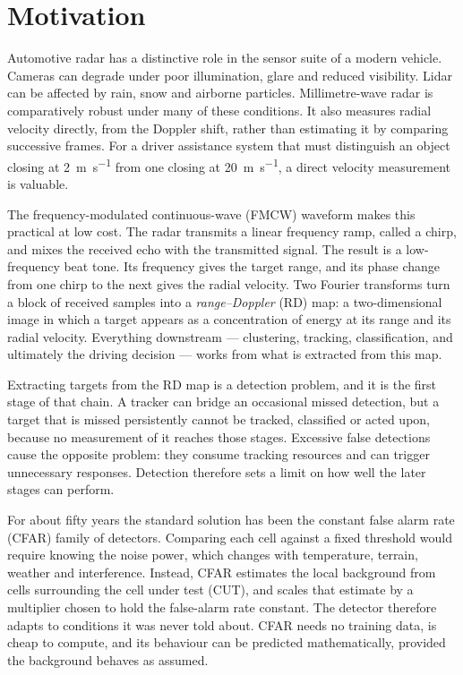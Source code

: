 
\section{Motivation}

Automotive radar has a distinctive role in the sensor suite of a modern vehicle. Cameras can degrade
under poor illumination, glare and reduced visibility. Lidar can be affected by rain, snow and
airborne particles. Millimetre-wave radar is comparatively robust under many of these conditions.
It also measures radial velocity directly, from the Doppler shift, rather than estimating it by
comparing successive frames. For a driver assistance system that must distinguish an object closing
at \SI{2}{\metre\per\second} from one closing at \SI{20}{\metre\per\second}, a direct velocity
measurement is valuable.

The frequency-modulated continuous-wave (FMCW) waveform makes this practical at low cost. The radar
transmits a linear frequency ramp, called a chirp, and mixes the received echo with the transmitted
signal. The result is a low-frequency beat tone. Its frequency gives the target range, and its phase
change from one chirp to the next gives the radial velocity. Two Fourier transforms turn a block of
received samples into a \emph{range--Doppler} (RD) map: a two-dimensional image in which a target
appears as a concentration of energy at its range and its radial velocity. Everything downstream ---
clustering, tracking, classification, and ultimately the driving decision --- works from what is
extracted from this map.

Extracting targets from the RD map is a detection problem, and it is the first stage of that chain.
A tracker can bridge an occasional missed detection, but a target that is missed persistently cannot
be tracked, classified or acted upon, because no measurement of it reaches those stages. Excessive
false detections cause the opposite problem: they consume tracking resources and can trigger
unnecessary responses. Detection therefore sets a limit on how well the later stages can perform.

For about fifty years the standard solution has been the constant false alarm rate (CFAR) family of
detectors. Comparing each cell against a fixed threshold would require knowing the noise power,
which changes with temperature, terrain, weather and interference. Instead, CFAR estimates the local
background from cells surrounding the cell under test (CUT), and scales that estimate by a
multiplier chosen to hold the false-alarm rate constant. The detector therefore adapts to conditions
it was never told about. CFAR needs no training data, is cheap to compute, and its behaviour can be
predicted mathematically, provided the background behaves as assumed.

